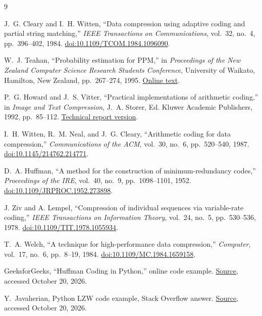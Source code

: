 \documentclass[12pt,onecolumn]{article}
\begin{document}
\begin{singlespace}
\begin{thebibliography}{9}

J.~G. Cleary and I.~H. Witten,
``Data compression using adaptive coding and partial string matching,''
\emph{IEEE Transactions on Communications}, vol.~32, no.~4,
pp.~396--402, 1984.
\href{https://doi.org/10.1109/TCOM.1984.1096090}{doi:10.1109/TCOM.1984.1096090}.

W.~J. Teahan,
``Probability estimation for PPM,''
in \emph{Proceedings of the New Zealand Computer Science Research Students
Conference}, University of Waikato, Hamilton, New Zealand,
pp.~267--274, 1995.
\href{https://cotty.16x16.com/compress/peppm.htm}{Online text}.

P.~G. Howard and J.~S. Vitter,
``Practical implementations of arithmetic coding,''
in \emph{Image and Text Compression}, J.~A. Storer, Ed.
Kluwer Academic Publishers, 1992, pp.~85--112.
\href{https://www.ittc.ku.edu/~jsv/Papers/HoV92.actech.pdf}{Technical report version}.

I.~H. Witten, R.~M. Neal, and J.~G. Cleary,
``Arithmetic coding for data compression,''
\emph{Communications of the ACM}, vol.~30, no.~6, pp.~520--540, 1987.
\href{https://doi.org/10.1145/214762.214771}{doi:10.1145/214762.214771}.

D.~A. Huffman,
``A method for the construction of minimum-redundancy codes,''
\emph{Proceedings of the IRE}, vol.~40, no.~9, pp.~1098--1101, 1952.
\href{https://doi.org/10.1109/JRPROC.1952.273898}{doi:10.1109/JRPROC.1952.273898}.

J. Ziv and A. Lempel,
``Compression of individual sequences via variable-rate coding,''
\emph{IEEE Transactions on Information Theory}, vol.~24, no.~5,
pp.~530--536, 1978.
\href{https://doi.org/10.1109/TIT.1978.1055934}{doi:10.1109/TIT.1978.1055934}.

T.~A. Welch,
``A technique for high-performance data compression,''
\emph{Computer}, vol.~17, no.~6, pp.~8--19, 1984.
\href{https://doi.org/10.1109/MC.1984.1659158}{doi:10.1109/MC.1984.1659158}.

GeeksforGeeks, ``Huffman Coding in Python,'' online code example.
\href{https://www.geeksforgeeks.org/dsa/huffman-coding-in-python/}{Source},
accessed October 20, 2026.

Y.~Javaherian, Python LZW code example, Stack Overflow answer.
\href{https://stackoverflow.com/a/77656917}{Source},
accessed October 20, 2026.

\end{thebibliography}
\end{singlespace}
\end{document}
